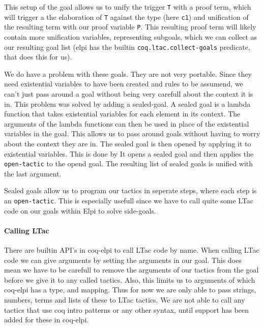 \documentclass[thesis.tex]{subfiles}
\begin{document}
This setup of the goal allows us to unify the trigger \texttt{T} with a proof term, which will trigger a the elaboration of \texttt{T} against the type (here \texttt{c1}) and unification of the resulting term with our proof variable \texttt{P}. This resulting proof term will likely contain more unification variables, representing subgoals, which we can collect as our resulting goal list (elpi has the builtin \texttt{coq.ltac.collect-goals} predicate, that does this for us).

We do have a problem with these goals. They are not very portable. Since they need existential variables to have been created and rules to be assumend, we can't just pass around a goal without being very carefull about the context it is in. This problem was solved by adding a sealed-goal. A sealed goal is a lambda function that takes existential variables for each element in its context. The arguments of the lambda functions can then be used in place of the existential variables in the goal. This allows us to pass around goals without having to worry about the context they are in. The sealed goal is then opened by applying it to existential variables. This is done by  It opens a sealed goal and then applies the \texttt{open-tactic} to the opend goal. The resulting list of sealed goals is unified with the last argument.

Sealed goals allow us to program our tactics in seperate steps, where each step is an \texttt{open-tactic}. This is especially usefull since we have to call quite some LTac code on our goals within Elpi to solve side-goals.

\paragraph*{Calling LTac}
There are builtin API's in coq-elpi to call LTac code by name. When calling LTac code we can give arguments by setting the arguments in our goal. This does mean we have to be carefull to remove the arguments of our tactics from the goal before we give it to any called tactics. Also, this limits us to arguments of which coq-elpi has a type, and mapping. Thus for now we are only able to pass strings, numbers, terms and lists of these to LTac tactics. We are not able to call any tactics that use coq intro patterns or any other syntax, until support has been added for these in coq-elpi.




\end{document}
